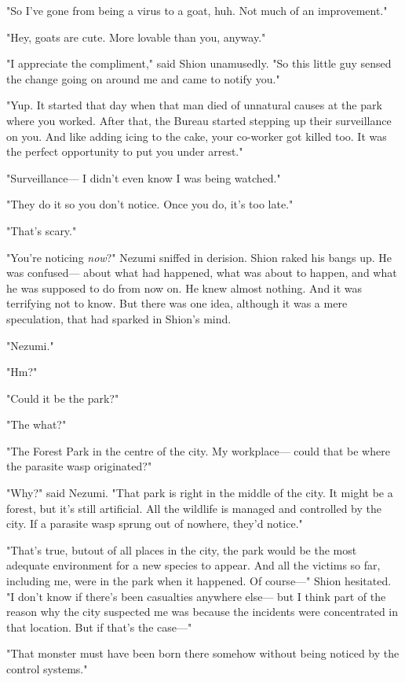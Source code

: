 "So I've gone from being a virus to a goat, huh. Not much of an
improvement."

"Hey, goats are cute. More lovable than you, anyway."

"I appreciate the compliment," said Shion unamusedly. "So this little
guy sensed the change going on around me and came to notify you."

"Yup. It started that day when that man died of unnatural causes at the
park where you worked. After that, the Bureau started stepping up their
surveillance on you. And like adding icing to the cake, your co-worker
got killed too. It was the perfect opportunity to put you under arrest."

"Surveillance--- I didn't even know I was being watched."

"They do it so you don't notice. Once you do, it's too late."

"That's scary."

"You're noticing \emph{now}?" Nezumi sniffed in derision. Shion raked his bangs
up. He was confused--- about what had happened, what was about to happen,
and what he was supposed to do from now on. He knew almost nothing. And
it was terrifying not to know. But there was one idea, although it was a
mere speculation, that had sparked in Shion's mind.

\mybreak

"Nezumi."

"Hm?"

"Could it be the park?"

"The what?"

"The Forest Park in the centre of the city. My workplace--- could that be
where the parasite wasp originated?"

"Why?" said Nezumi. "That park is right in the middle of the city. It
might be a forest, but it's still artificial. All the wildlife is
managed and controlled by the city. If a parasite wasp sprung out of
nowhere, they'd notice."

"That's true, but\el out of all places in the city, the park would be
the most adequate environment for a new species to appear. And all the
victims so far, including me, were in the park when it happened. Of
course---" Shion hesitated. "I don't know if there's been casualties
anywhere else--- but I think part of the reason why the city suspected me
was because the incidents were concentrated in that location. But if
that's the case---"

"That monster must have been born there somehow without being noticed by
the control systems."

